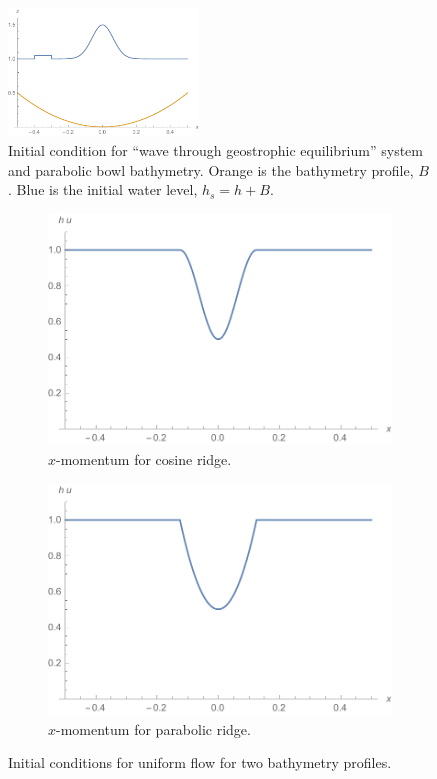 \begin{figure}
  \centering
  \includegraphics[width=0.45\textwidth]{diagrams/init-geo-wave}
  \caption{Initial condition for ``wave through geostrophic equilibrium'' system and parabolic bowl bathymetry. Orange is the bathymetry profile, $B$. Blue is the initial water level, $h_s = h + B$.}
  \label{fig:init_geo_wave}
\end{figure}

\begin{figure}
  \centering
  \begin{subfigure}{0.45\textwidth}
    \includegraphics[width=\textwidth]{diagrams/init-steady-cosine}
    \caption{$x$-momentum for cosine ridge.}
    \label{fig:init-steady-cosine}
  \end{subfigure}
  \begin{subfigure}{0.45\textwidth}
    \includegraphics[width=\textwidth]{diagrams/init-steady-para}
    \caption{$x$-momentum for parabolic ridge.}
    \label{fig:init-steady-para}
  \end{subfigure}
  \caption{Initial conditions for uniform flow for two bathymetry profiles.}
  \label{fig:init_flow}
\end{figure}

